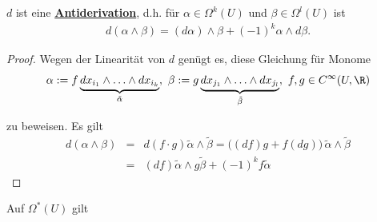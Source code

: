 \label{vektoranalysis/diffformen:Antiderivation}
\begin{theorem}{}{}



\par
\(d\) ist eine \href{https://de.wikipedia.org/wiki/Derivation\_(Mathematik)\#Antiderivationen}{\textbf{Antiderivation}}, d.h. für \(\alpha\in\Omega^k(U)\) und \(\beta\in\Omega^l(U)\) ist
\begin{align*}
d(\alpha\wedge\beta) = (d\alpha)\wedge\beta+(-1)^k\alpha\wedge d\beta.
\end{align*}\end{theorem}

\begin{proof}
 Wegen der Linearität von \(d\) genügt es, diese Gleichung für Monome
\begin{align*}
\alpha := f\underbrace{dx_{i_1}\wedge\ldots\wedge dx_{i_k}}_{\tilde
{\alpha}},\ \beta := g\underbrace{dx_{j_1}\wedge\ldots\wedge dx_{j_l}}_
{\tilde{\beta}},\ f,g\in C^\infty(U,\R)
\end{align*}
\par
zu beweisen.
Es gilt
\begin{align*}
d(\alpha\wedge\beta) &=& d(f\cdot g)\tilde{\alpha}\wedge
\tilde{\beta} = \big((df)g+f(dg)\big)\,\tilde{\alpha}\wedge\tilde{\beta}\\
&=& (df)\tilde{\alpha}\wedge g\tilde{\beta}+ (-1)^kf\tilde{\alpha}
\end{align*}\end{proof}
\label{vektoranalysis/diffformen:thm:dd}
\begin{theorem}{}{}



\par
Auf \(\Omega^*(U)\) gilt
\end{theorem}


